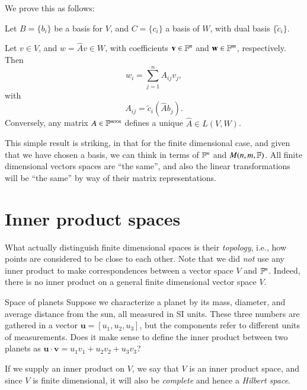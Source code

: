 We prove this as follows:

Let $B = \{b_i\}$ be a basis for $V$, and  $C = \{c_i\}$ a basis of $W$, with dual basis $\{\tilde{c}_i\}$.

Let $v \in V$, and $w = \hat{A}v \in W$, with coefficients $\mathbf{v}\in \mathbb{F}^n$ and $\mathbf{w}\in \mathbb{F}^m$, respectively. Then
\begin{equation}
    w_i = \sum_{j=1}^n A_{ij} v_j,
\end{equation}
with
\begin{equation}
    A_{ij} = \tilde{c}_i(\hat{A} b_j).
\end{equation}
Conversely, any matrix $A\in\mathbb{F}^{m\times n}$ defines a unique $\hat{A}\in L(V,W)$.


This simple result is striking, in that for the finite dimensional case, and given that we have chosen a basis, we can think in terms of $\mathbb{F}^n$ and $M(n,m,\mathbb{F})$. All finite dimensional vectors spaces are ``the same'', and also the linear transformations will be ``the same'' by way of their matrix representations.

\section{Inner product spaces}

What actually distinguish finite dimensional spaces is their \emph{topology}, i.e., how points are considered to be close to each other. Note that we did \emph{not} use any inner product to make correspondences between a vector space $V$ and $\mathbb{F}^n$. Indeed, there is no inner product on a general finite dimensional vector space $V$.

\begin{myExample}{Space of planets}{}
    Suppose we characterize a planet by its mass, diameter, and average distance from the sun, all measured in SI units. These three numbers are gathered in a vector $\mathbf{u} = [u_1, u_2, u_3]$, but the components refer to different units of measurements. Does it make sense to define the inner product between two planets as $\mathbf{u}\cdot\mathbf{v} = u_1 v_1 + u_2v_2 + u_3 v_3$?
\end{myExample}


If we supply an inner product on $V$, we say that $V$ is an inner product space, and since $V$ is finite dimensional, it will also be \emph{complete} and hence a \emph{Hilbert space}. 

